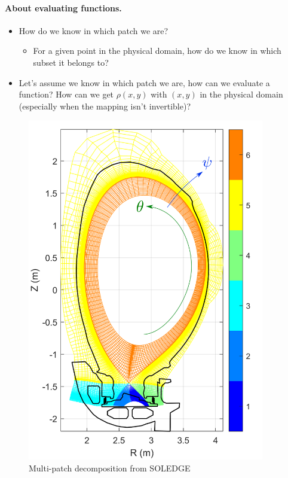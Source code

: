 \documentclass[presentation.tex]{subfiles}
\begin{document}
\paragraph{About evaluating functions.}
\begin{itemize}
	\item How do we know in which patch we are?
	\begin{itemize}
		\item For a given point in the physical domain, how do we know in which subset it belongs to?
	\end{itemize}
	\item Let's assume we know in which patch we are, how can we evaluate a function? How can we get $\rho(x,y)$ with $(x,y)$ in the physical domain (especially when the mapping isn't invertible)?
\end{itemize}





\begin{figure}[!h]
\centering
	\includegraphics[height=15cm]{images/JET_zones2_SOLEDGE.png}
\caption{Multi-patch decomposition from SOLEDGE}
\end{figure}

\newpage
\end{document}
